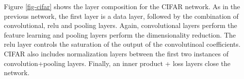 Figure \ref{fig-cifar} shows the layer composition for the CIFAR network. 
As in the previous network, the first layer is a data layer, followed by 
the combination of convolutional, relu and pooling layers. Again, convolutional 
layers perform the feature learning and pooling layers perform the 
dimensionality reduction. The relu layer controls the saturation of 
the output of the convolutinoal coefficients. CIFAR also includes 
normalization layers between the first two instances of convolution+pooling 
layers.  Finally, an inner product + loss layers close the network. 


